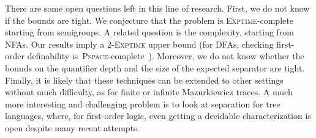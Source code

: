 \documentclass{CSML}
\theoremstyle{plain}
\begin{document}
There are some open questions left in this line of research. First, we do not
know if the bounds are tight. We conjecture that the problem is
\textsc{Exptime}-complete starting from semigroups. A related question is the
complexity, starting from NFAs. Our results imply a 2-\textsc{Exptime} upper
bound (for DFAs, checking first-order definability
is~\textsc{Pspace}-complete~\cite{DFA-sf-PSPACE}). Moreover, we do not know
whether the bounds on the quantifier depth and the size of the expected
separator are tight. Finally, it is likely that these techniques can be
extended to other settings without much difficulty, as for finite or infinite
Mazurkiewicz traces. A much more interesting and challenging problem is to
look at separation for tree languages, where, for first-order logic, even
getting a decidable characterization is open despite many recent attempts.
\end{document}

